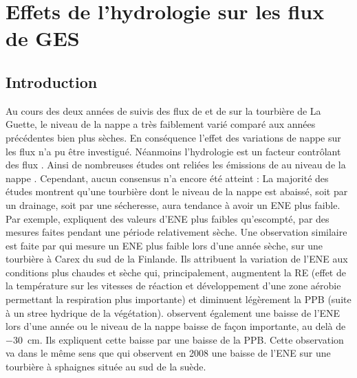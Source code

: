 \singlespacing
\chapter{Effets de l'hydrologie sur les flux de GES}
\label{ch:4}

\minitoc

\newpage
\doublespacing
\section{Introduction}

Au cours des deux années de suivis des flux de \coo et de \chh sur la tourbière de La Guette, le niveau de la nappe a très faiblement varié comparé aux années précédentes bien plus sèches.
En conséquence l'effet des variations de nappe sur les flux n'a pu être investigué.
Néanmoins l'hydrologie est un facteur contrôlant des flux \plop.
Ainsi de nombreuses études ont reliées les émissions de \coo au niveau de la nappe \plop.
Cependant, aucun consensus n'a encore été atteint :
La majorité des études montrent qu'une tourbière dont le niveau de la nappe est abaissé, soit par un drainage, soit par une sécheresse, aura tendance à avoir un ENE plus faible.
Par exemple, \citet{strack2013} expliquent des valeurs d'ENE plus faibles qu'escompté, par des mesures faites pendant une période relativement sèche.
Une observation similaire est faite par \citet{aurela2007} qui mesure un ENE plus faible lors d'une année sèche, sur une tourbière à Carex du sud de la Finlande.
Ils attribuent la variation de l'ENE aux conditions plus chaudes et sèche qui, principalement, augmentent la RE (effet de la température sur les vitesses de réaction et développement d'une zone aérobie permettant la respiration plus importante) et diminuent légèrement la PPB (suite à un stree hydrique de la végétation).
\citet{peichl2014} observent également une baisse de l'ENE lors d'une année ou le niveau de la nappe baisse de façon importante, au delà de \SI{-30}{\centi\metre}.
Ils expliquent cette baisse par une baisse de la PPB.
Cette observation va dans le même sens que \citet{lund2012} qui observent en 2008 une baisse de l'ENE sur une tourbière à sphaignes située au sud de la suède.
